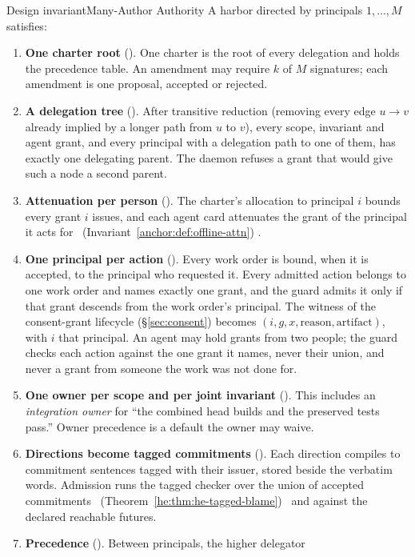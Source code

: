 \begin{pdclaim}{Design invariant}{Many-Author Authority}
\setlength{\parskip}{4pt plus 1pt}
\label{def:ls-many-authors}
A harbor directed by principals $1,\dots,M$ satisfies:
\begin{enumerate}[leftmargin=2.2em,itemsep=2pt,label=R\arabic*.]
\item \textbf{One charter root} (\Vision). One charter is the root of every
delegation and holds the precedence table. An amendment may require $k$ of $M$
signatures; each amendment is one proposal, accepted or rejected.
\item \textbf{A delegation tree} (\Designed). After transitive reduction (removing
every edge $u\to v$ already implied by a longer path from $u$ to $v$), every
scope, invariant and agent grant, and every principal with a delegation path
to one of them, has exactly one delegating parent. The daemon refuses a grant
that would give such a node a second parent.
\item \textbf{Attenuation per person} (\Vision). The charter's allocation to
principal $i$ bounds every grant $i$ issues, and each agent card attenuates the
grant of the principal it acts for%
\ifpdbook
\ (Invariant~\ref{anchor:def:offline-attn})%
\fi
.
\item \textbf{One principal per action} (\Designed). Every work order is bound,
when it is accepted, to the principal who requested it. Every admitted action
belongs to one work order and names exactly one grant, and the guard admits it
only if that grant descends from the work order's principal. The witness of the
consent-grant lifecycle (\S\ref{sec:consent}) becomes
$(i, g, x, \text{reason}, \text{artifact})$, with $i$ that principal. An agent
may hold grants from two people; the guard checks each action against the one
grant it names, never their union, and never a grant from someone the work was
not done for.
\item \textbf{One owner per scope and per joint invariant} (\Vision). This
includes an \emph{integration owner} for ``the combined head builds and the
preserved tests pass.'' Owner precedence is a default the owner may waive.
\item \textbf{Directions become tagged commitments} (\Designed). Each
direction compiles to commitment sentences tagged with their issuer, stored
beside the verbatim words. Admission runs the tagged checker over the union of
accepted commitments%
\ifpdbook
\ (Theorem~\ref{he:thm:he-tagged-blame})%
\fi
\ and against the declared reachable futures.
\item \textbf{Precedence} (\Vision). Between principals, the higher delegator

\end{enumerate}
\end{pdclaim}
